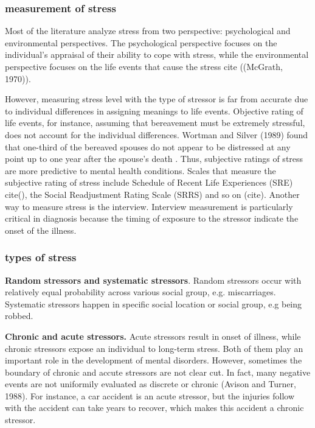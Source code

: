 \subsubsection{measurement of stress}
Most of the literature analyze stress from two perspective: psychological and environmental perspectives. The psychological perspective focuses on the individual's appraisal of their ability to cope with stress, while the environmental perspective focuses on the life events that cause the stress cite ((McGrath, 1970)). 

However, measuring stress level with the type of stressor is far from accurate due to individual differences in assigning meanings to life events. Objective rating of life events, for instance, assuming that bereavement must be extremely stressful, does not account for the individual differences.  Wortman
and Silver (1989) found that one-third of the bereaved spouses do not appear to be distressed at any point up to one year after the spouse's death \cite{wortman1989myths}. Thus, subjective ratings of stress are more predictive to mental health conditions.  Scales that measure the subjective rating of stress include Schedule of Recent Life Experiences (SRE) cite(), the Social Readjustment Rating Scale (SRRS) and so on (cite). Another way to measure stress is the interview. Interview measurement is particularly critical in diagnosis because the timing of exposure to the stressor indicate the onset of the illness.


\subsubsection{types of stress}
\textbf{Random stressors and systematic stressors}. Random stressors occur with relatively equal probability across various social group, e.g. miscarriages. Systematic stressors happen in specific social location or social group, e.g being robbed. 

\textbf{Chronic and acute stressors.}  Acute stressors result in onset of illness, while chronic stressors expose an individual to long-term stress. Both of them play an important role in the development of mental disorders. However, sometimes the boundary of chronic and accute stressors are not clear cut. In fact, many negative events are not uniformily evaluated as discrete or chronic (Avison and Turner, 1988). For instance, a car accident is an acute stressor, but the injuries follow with the accident can take years to recover, which makes this accident a chronic stressor.

